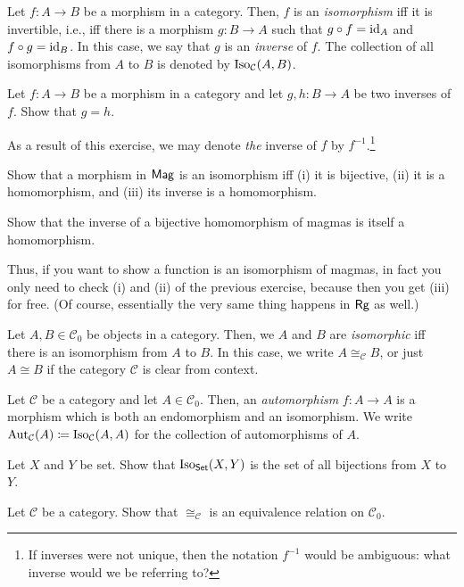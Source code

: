 \begin{dfn}[Isomorphism]
Let $f:A\rightarrow B$ be a morphism in a category.  Then, $f$ is an \emph{isomorphism} iff it is invertible, i.e., iff there is a morphism $g:B\rightarrow A$ such that $g\circ f=\operatorname{id} _A$ and $f\circ g=\operatorname{id} _B$.  In this case, we say that $g$ is an \emph{inverse} of $f$.  The collection of all isomorphisms from $A$ to $B$ is denoted by $\operatorname{Iso} _{\mathcal{C}}(A,B)$.
\end{dfn}
\begin{exr}
Let $f:A\rightarrow B$ be a morphism in a category and let $g,h:B\rightarrow A$ be two inverses of $f$.  Show that $g=h$.
\begin{rmk}
As a result of this exercise, we may denote \emph{the} inverse of $f$ by $f^{-1}$.\footnote{If inverses were not unique, then the notation $f^{-1}$ would be ambiguous:  what inverse would we be referring to?}
\end{rmk}
\end{exr}
\begin{exr}
Show that a morphism in $\mathsf{Mag}$ is an isomorphism iff (i) it is bijective, (ii) it is a homomorphism, and (iii) its inverse is a homomorphism.
\end{exr}
\begin{exr}\label{exrA.2.11x}
Show that the inverse of a bijective homomorphism of magmas is itself a homomorphism.
\begin{rmk}
Thus, if you want to show a function is an isomorphism of magmas, in fact you only need to check (i) and (ii) of the previous exercise, because then you get (iii) for free.  (Of course, essentially the very same thing happens in $\mathsf{Rg}$ as well.)
\end{rmk}
\end{exr}
\begin{dfn}[Isomorphic]\label{dfnA.2.10}
Let $A,B\in \mathcal{C}_0$ be objects in a category.  Then, we $A$ and $B$ are \emph{isomorphic} iff there is an isomorphism from $A$ to $B$.  In this case, we write $A\cong _{\mathcal{C}}B$, or just $A\cong B$ if the category $\mathcal{C}$ is clear from context.
\end{dfn}
\begin{dfn}[Automorphisms]
Let $\mathcal{C}$ be a category and let $A\in \mathcal{C}_0$.  Then, an \emph{automorphism} $f:A\rightarrow A$ is a morphism which is both an endomorphism and an isomorphism.  We write $\operatorname{Aut} _{\mathcal{C}}(A)\coloneqq \operatorname{Iso} _{\mathcal{C}}(A,A)$ for the collection of automorphisms of $A$.
\end{dfn}
\begin{exr}\label{exr2.1.3}
Let $X$ and $Y$ be set.  Show that $\operatorname{Iso} _{\mathsf{Set}}(X,Y)$ is the set of all bijections from $X$ to $Y$.
\end{exr}
\begin{exr}\label{exrA.2.11}
Let $\mathcal{C}$ be a category.  Show that $\cong _{\mathcal{C}}$ is an equivalence relation on $\mathcal{C}_0$.
\end{exr}
